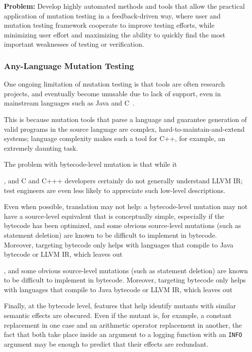 \begin{framed}
{\bf Problem:}  Develop highly automated methods and tools that allow the practical application of mutation testing in a feedback-driven way, where user and mutation testing framework cooperate to improve testing efforts, while minimizing user effort and maximizing the ability to quickly find the most important weaknesses of testing or verification.
\end{framed}

\subsubsection{Any-Language Mutation Testing}

One ongoing limitation of mutation testing is that tools are often research
projects, and eventually become unusable due to lack of support, even in
mainstream languages such as Java and C~\cite{MutChoice}.

This is because mutation tools that parse a language and guarantee generation of
valid programs in the source language are complex, hard-to-maintain-and-extend
systems; language complexity makes such a tool for C++, for example, an
extremely daunting task.   

The problem with bytecode-level mutation is that while it

, and C and C+++ developers certainly do not generally understand LLVM IR; test
engineers are even less likely to appreciate such low-level descriptions.  

Even when possible, translation may not help: a bytecode-level mutation may not
have a source-level equivalent that is conceptually simple, especially if the
bytecode has been optimized, and some obvious source-level mutations (such as
statement deletion) are known to be difficult to implement in bytecode.
Moreover, targeting bytecode only helps with languages that compile to Java
bytecode or LLVM IR, which leaves out 

, and some obvious source-level mutations (such as
statement deletion) are known to be difficult to implement in bytecode.
Moreover, targeting bytecode only helps with languages that compile to Java
bytecode or LLVM IR, which leaves out 

  Finally, at the bytecode level, features that help identify mutants with similar semantic effects are obscured.  Even if the mutant is, for example, a constant replacement in one case and an arithmetic operator replacement in another, the fact that both take place inside an argument to a logging function with an {\tt INFO} argument may be enough to predict that their effects are redundant.

